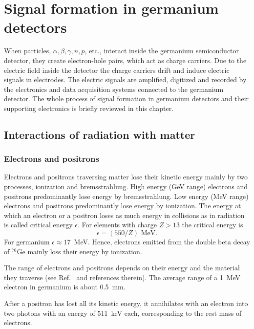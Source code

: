 \chapter{Signal formation in germanium detectors}
\label{cha:detector}
When particles, $\alpha, \beta, \gamma, n, p$, etc., interact inside the germanium semiconductor detector, they create electron-hole pairs, which act as charge carriers. Due to the electric field inside the detector the charge carriers drift and induce electric signals in electrodes. The electric signals are amplified, digitized and recorded by the electronics and data acquisition systems connected to the germanium detector. The whole process of signal formation in germanium detectors and their supporting electronics is briefly reviewed in this chapter.

\section{Interactions of radiation with matter}
\label{sec:det:phys}

\subsection{Electrons and positrons}
\label{sec:det:ep}
Electrons and positrons traversing matter lose their kinetic energy mainly by two processes, ionization and bremsstrahlung. High energy (GeV range) electrons and positrons predominantly lose energy by bremsstrahlung. Low energy (MeV range) electrons and positrons predominantly lose energy by ionization. The energy at which an electron or a positron loses as much energy in collisions as in radiation is called critical energy $\epsilon$. For elements with charge $Z > 13$ the critical energy is \cite{Ama81}
\begin{equation}
\label{eq:det:ecrit}
\epsilon = (550/Z) \text{ MeV}.
\end{equation}
For germanium $\epsilon \approx 17$~MeV. Hence, electrons emitted from the double beta decay of $^{76}$Ge mainly loss their energy by ionization.

The range of electrons and positrons depends on their energy and the material they traverse (see Ref.~\cite{Bri84} and references therein). The average range of a 1~MeV electron in germanium is about 0.5~mm.

After a positron has lost all its kinetic energy, it annihilates with an electron into two photons with an energy of 511~keV each, corresponding to the rest mass of electrons.

